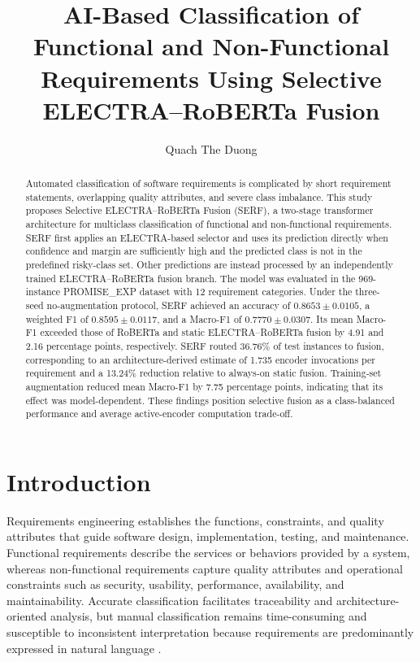 \documentclass[runningheads]{llncs}
\begin{document}
\title{AI-Based Classification of Functional and Non-Functional Requirements Using Selective ELECTRA--RoBERTa Fusion}
\author{Quach The Duong}
\maketitle

\begin{abstract}
Automated classification of software requirements is complicated by short requirement statements, overlapping quality attributes, and severe class imbalance. This study proposes Selective ELECTRA--RoBERTa Fusion (SERF), a two-stage transformer architecture for multiclass classification of functional and non-functional requirements. SERF first applies an ELECTRA-based selector and uses its prediction directly when confidence and margin are sufficiently high and the predicted class is not in the predefined risky-class set. Other predictions are instead processed by an independently trained ELECTRA--RoBERTa fusion branch. The model was evaluated in the 969-instance PROMISE\_EXP dataset with 12 requirement categories. Under the three-seed no-augmentation protocol, SERF achieved an accuracy of \(0.8653 \pm 0.0105\), a weighted F1 of \(0.8595 \pm 0.0117\), and a Macro-F1 of \(0.7770 \pm 0.0307\). Its mean Macro-F1 exceeded those of RoBERTa and static ELECTRA--RoBERTa fusion by 4.91 and 2.16 percentage points, respectively. SERF routed \(36.76\%\) of test instances to fusion, corresponding to an architecture-derived estimate of 1.735 encoder invocations per requirement and a 13.24\% reduction relative to always-on static fusion. Training-set augmentation reduced mean Macro-F1 by 7.75 percentage points, indicating that its effect was model-dependent. These findings position selective fusion as a class-balanced performance and average active-encoder computation trade-off.
\end{abstract}

\section{Introduction}\label{sec:introduction}

Requirements engineering establishes the functions, constraints, and quality attributes that guide software design, implementation, testing, and maintenance. Functional requirements describe the services or behaviors provided by a system, whereas non-functional requirements capture quality attributes and operational constraints such as security, usability, performance, availability, and maintainability. Accurate classification facilitates traceability and architecture-oriented analysis, but manual classification remains time-consuming and susceptible to inconsistent interpretation because requirements are predominantly expressed in natural language \cite{kaur_ai_requirements,shreda_nfr_nlp,kassab_ensemble_requirements}.
\end{document}
